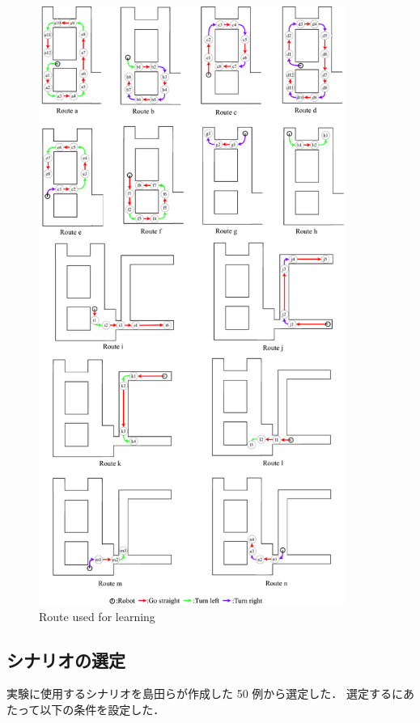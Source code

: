 \begin{figure}[h]
  \centering
  \includegraphics[width=100mm]{images/pdf/ishiguro/route.pdf}
  \caption{Route used for learning}
  \label{fig:route}
\end{figure}

\clearpage
\subsection{シナリオの選定}
実験に使用するシナリオを島田らが作成した 50 例から選定した．
選定するにあたって以下の条件を設定した．

